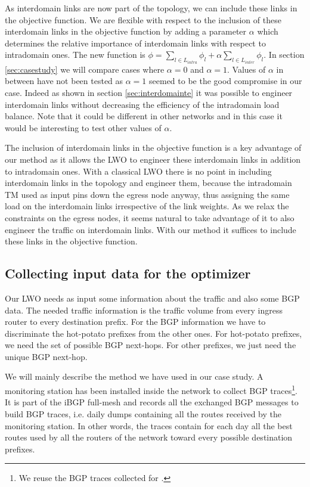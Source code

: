 \documentclass{acm_proc_article-sp}
\begin{document}
As interdomain
links are now part of the topology, we can include these links in the
objective function. We are flexible with respect to the inclusion
of these interdomain links in the objective function by adding a
parameter $\alpha$ which determines the relative importance of
interdomain links with respect to intradomain ones. The new
function is $\phi = \sum_{l \in L_{intra}} \phi_l + \alpha
\sum_{l \in L_{inter}} \phi_l$. In section \ref{sec:casestudy} we will compare
cases where $\alpha = 0$ and $\alpha = 1$. Values of $\alpha$ in
  between have not been tested as $\alpha = 1$ seemed to be the good
  compromise in our case. Indeed as shown in section
  \ref{sec:interdomainte} it was possible to engineer interdomain
  links without decreasing the efficiency of the intradomain load
  balance. Note that it could be different in other networks and in
  this case it would be interesting to test other values of $\alpha$.

The inclusion of interdomain links in the objective function is a key
advantage of our method as it allows the LWO to engineer
these interdomain links in addition to intradomain ones. 
With a classical LWO there is no point in including interdomain links 
in the topology and engineer them,
because the intradomain TM used as input pins down the egress node anyway, 
thus assigning the same
load on the interdomain links irrespective of the link weights.
As we relax the constraints on the egress nodes, it seems natural to take advantage of it to
also engineer the traffic on interdomain links. With our method it suffices 
to include these links in the objective function. 

\subsection{Collecting input data for the optimizer}
\label{sec:datacollect}

Our LWO needs as input some information about the
traffic and also some BGP data. The needed traffic
information is the traffic volume from every ingress
router to every destination prefix. For the BGP information we
have to discriminate the hot-potato prefixes from the other ones.
For hot-potato prefixes, we need the set of possible BGP next-hops.
For other prefixes, we just need the unique BGP next-hop.

We will mainly describe the method we
have used in our case study. A monitoring station has been installed inside the network to collect
BGP traces\footnote{We reuse the BGP traces collected for \cite{uhlig-ccr-matrices}.}. It is part of the iBGP full-mesh
and records all the exchanged BGP messages to build BGP traces, 
i.e. daily dumps containing all the routes received by
the monitoring station. In other words, the traces contain for each day all the best routes
used by all the routers of the network toward every possible
destination prefixes.
\end{document}
